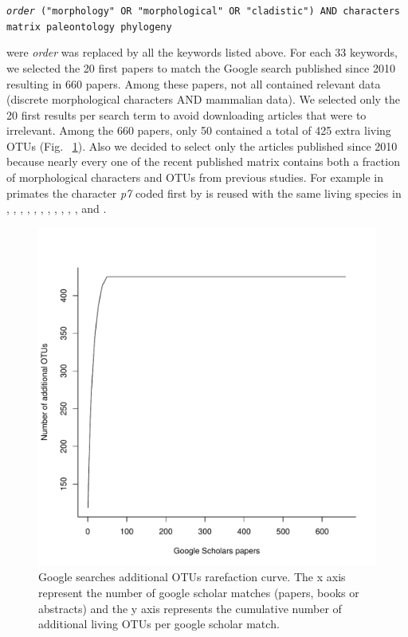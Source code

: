 \texttt{\textit{order} ("morphology" OR "morphological" OR "cladistic") AND characters matrix paleontology phylogeny}

were \textit{order} was replaced by all the keywords listed above. For each 33 keywords, we selected the 20 first papers to match the Google search published since 2010 resulting in 660 papers.
Among these papers, not all contained relevant data (discrete morphological characters AND mammalian data).
We selected only the 20 first results per search term to avoid downloading articles that were to irrelevant. Among the 660 papers, only 50 contained a total of 425 extra living OTUs (Fig. ~\ref{Supp_figure_google_searches}).
Also we decided to select only the articles published since 2010 because nearly every one of the recent published matrix contains both a fraction of morphological characters and OTUs from previous studies.
For example in primates the character \textit{p7} coded first by \cite{ross1998phylogenetic} is reused with the same living species in \cite{seiffert2003fossil}, \cite{marivaux2005anthropoid}, \cite{seiffert2005basal}, \cite{bloch2007new}, \cite{bloch2007new}, \cite{kay2008anatomy}, \cite{silcox2008biogeographic}, \cite{seiffert2009convergent}, \cite{tabuce2009anthropoid}, \cite{boyer2010astragalar}, \cite{seiffert2010fossil}, \cite{marivaux2013djebelemur} and \cite{ni2013oldest}.

\begin{figure}[!h]
\centering
    \includegraphics[width=1\textwidth]{Missing_mammals/Figures/Supp_figure_google_searches.pdf}
\caption[Google searches additional OTUs rarefaction curve.]{Google searches additional OTUs rarefaction curve. The x axis represent the number of google scholar matches (papers, books or abstracts) and the y axis represents the cumulative number of additional living OTUs per google scholar match.}
\label{Supp_figure_google_searches}
\end{figure}


